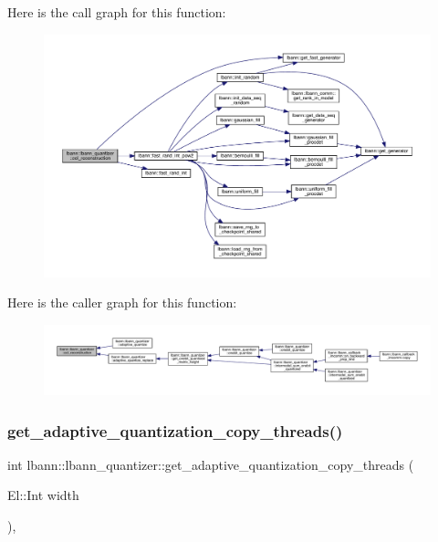 Here is the call graph for this function\+:\nopagebreak
\begin{figure}[H]
\begin{center}
\leavevmode
\includegraphics[width=350pt]{classlbann_1_1lbann__quantizer_af77beca5905ff8601ca9b8231a2a16e0_cgraph}
\end{center}
\end{figure}
Here is the caller graph for this function\+:\nopagebreak
\begin{figure}[H]
\begin{center}
\leavevmode
\includegraphics[width=350pt]{classlbann_1_1lbann__quantizer_af77beca5905ff8601ca9b8231a2a16e0_icgraph}
\end{center}
\end{figure}
\mbox{\label{classlbann_1_1lbann__quantizer_a22b898932caed41ccf24abcb67c00ba1}} 
\subsubsection{\texorpdfstring{get\+\_\+adaptive\+\_\+quantization\+\_\+copy\+\_\+threads()}{get\_adaptive\_quantization\_copy\_threads()}}
{\footnotesize\ttfamily int lbann\+::lbann\+\_\+quantizer\+::get\+\_\+adaptive\+\_\+quantization\+\_\+copy\+\_\+threads (\begin{DoxyParamCaption}\item[{El\+::\+Int}]{width }\end{DoxyParamCaption})\hspace{0.3cm}{\ttfamily [inline]}, {\ttfamily [private]}}

